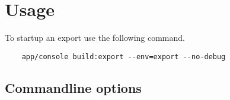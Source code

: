 \section{Usage}

To startup an export use the following command.

\begin{verbatim}
    app/console build:export --env=export --no-debug
\end{verbatim}



\subsection{Commandline options}


